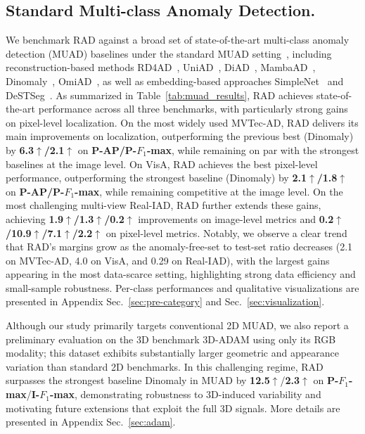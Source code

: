 \documentclass{article}
\theoremstyle{plain}
\theoremstyle{definition}
\theoremstyle{remark}
\begin{document}
\subsection{Standard Multi-class Anomaly Detection.}
We benchmark RAD against a broad set of state-of-the-art multi-class anomaly detection (MUAD) baselines under the standard MUAD setting~\cite{guo2025dinomaly}, including reconstruction-based methods RD4AD~\cite{deng2022anomaly}, UniAD~\cite{you2022unified}, DiAD~\cite{he2024diffusion}, MambaAD~\cite{he2024mambaad}, Dinomaly~\cite{guo2025dinomaly}, OmiAD~\cite{fengomiad}, as well as embedding-based approaches SimpleNet~\cite{liu2023simplenet} and DeSTSeg~\cite{zhang2023destseg}. As summarized in Table~\ref{tab:muad_results}, RAD achieves state-of-the-art performance across all three benchmarks, with particularly strong gains on pixel-level localization.
On the most widely used MVTec-AD, RAD delivers its main improvements on localization, outperforming the previous best (Dinomaly) by \textbf{6.3$\uparrow$/2.1$\uparrow$} on \textbf{P-AP/P-$F_1$-max}, while remaining on par with the strongest baselines at the image level.
On VisA, RAD achieves the best pixel-level performance, outperforming the strongest baseline (Dinomaly) by \textbf{2.1$\uparrow$/1.8$\uparrow$} on \textbf{P-AP/P-$F_1$-max}, while remaining competitive at the image level.
On the most challenging multi-view Real-IAD, RAD further extends these gains, achieving \textbf{1.9$\uparrow$/1.3$\uparrow$/0.2$\uparrow$} improvements on image-level metrics and \textbf{0.2$\uparrow$/10.9$\uparrow$/7.1$\uparrow$/2.2$\uparrow$} on pixel-level metrics. Notably, we observe a clear trend that RAD’s margins grow as the anomaly-free-set to test-set ratio decreases (2.1 on MVTec-AD, 4.0 on VisA, and 0.29 on Real-IAD), with the largest gains appearing in the most data-scarce setting, highlighting strong data efficiency and small-sample robustness. Per-class performances and qualitative visualizations are presented in Appendix Sec.~\ref{sec:pre-category} and Sec.~\ref{sec:visualization}.

Although our study primarily targets conventional 2D MUAD, we also report a preliminary evaluation on the 3D benchmark 3D-ADAM using only its RGB modality; this dataset exhibits substantially larger geometric and appearance variation than standard 2D benchmarks.
In this challenging regime, RAD surpasses the strongest baseline Dinomaly in MUAD by \textbf{12.5$\uparrow$}/\textbf{2.3$\uparrow$} on \textbf{P-$F_1$-max}/\textbf{I-$F_1$-max}, demonstrating robustness to 3D-induced variability and motivating future extensions that exploit the full 3D signals. More details are presented in Appendix Sec.~\ref{sec:adam}.
\end{document}
